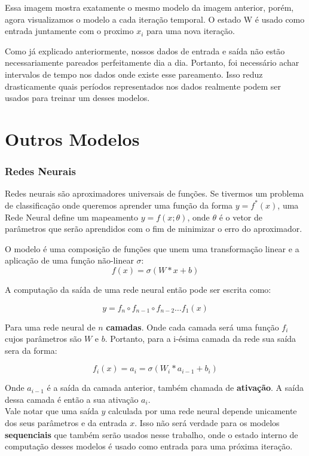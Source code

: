 % 


Essa imagem mostra exatamente o mesmo modelo da imagem anterior, porém, agora visualizamos o modelo a cada iteração temporal. O estado W é usado como entrada juntamente com o proximo $x_i$ para uma nova iteração.

\bigskip

Como já explicado anteriormente, nossos dados de entrada e saída não estão necessariamente pareados perfeitamente dia a dia. Portanto, foi necessário achar intervalos de tempo nos dados onde existe esse pareamento. Isso reduz drasticamente quais períodos representados nos dados realmente podem ser usados para treinar um desses modelos.


\section{Outros Modelos} 

\subsubsection{Redes Neurais}


Redes neurais são aproximadores universais de funções. Se tivermos um problema
de classificação onde queremos aprender uma função da forma $y = f^*(x)$, uma
Rede Neural define um mapeamento $y = f(x ; \theta)$, onde $\theta$ é o vetor de
parâmetros que serão aprendidos com o fim de minimizar o erro do aproximador.

O modelo é uma composição de funções que unem uma transformação linear e
a aplicação de uma função não-linear $\sigma$: \\

\[ f(x)=  \sigma(W*x + b) \]

A computação da saída de uma rede neural então pode ser escrita como:

\[   y = f_n \circ f_{n-1} \circ f_{n-2} \dots f_1(x)  \]

Para uma rede neural de $n$ \textbf{camadas}. Onde cada camada será uma função
$f_i$ cujos parâmetros são $W$ e $b$. Portanto, para a i-ésima camada da rede
sua saída sera da forma: 

\[ f_i (x)=  a_i = \sigma(W_i*a_{i-1} + b_i) \]

Onde $a_{i-1}$ é a saída da camada anterior, também chamada de
\textbf{ativação}. A saída dessa camada é então a sua ativação $a_i$. \\ 

Vale notar que uma saída $y$ calculada por uma rede neural depende unicamente dos
seus parâmetros e da entrada $x$. Isso não será verdade para os modelos
\textbf{sequenciais} que também serão usados nesse trabalho, onde o estado
interno de computação desses modelos é usado como entrada para uma próxima
iteração. \\

